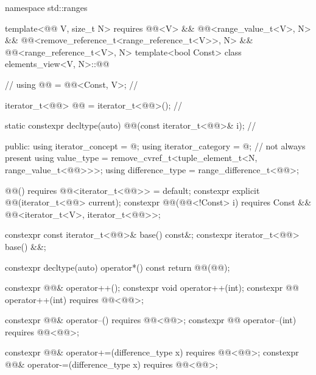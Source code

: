 %
\begin{codeblock}
namespace std::ranges {
  template<@@ V, size_t N>
    requires @@<V> && @@<range_value_t<V>, N> &&
             @@<remove_reference_t<range_reference_t<V>>, N> &&
             @@<range_reference_t<V>, N>
  template<bool Const>
  class elements_view<V, N>::@@ {                 // \expos
    using @@ = @@<Const, V>;                 // \expos

    iterator_t<@@> @@ = iterator_t<@@>();     // \expos

    static constexpr decltype(auto) @@(const iterator_t<@@>& i);     // \expos

  public:
    using iterator_concept = @\seebelow@;
    using iterator_category = @\seebelow@;                // not always present
    using value_type = remove_cvref_t<tuple_element_t<N, range_value_t<@@>>>;
    using difference_type = range_difference_t<@@>;

    @@() requires @@<iterator_t<@@>> = default;
    constexpr explicit @@(iterator_t<@@> current);
    constexpr @@(@@<!Const> i)
      requires Const && @@<iterator_t<V>, iterator_t<@@>>;

    constexpr const iterator_t<@@>& base() const&;
    constexpr iterator_t<@@> base() &&;

    constexpr decltype(auto) operator*() const
    { return @@(@@); }

    constexpr @@& operator++();
    constexpr void operator++(int);
    constexpr @@ operator++(int) requires @@<@@>;

    constexpr @@& operator--() requires @@<@@>;
    constexpr @@ operator--(int) requires @@<@@>;

    constexpr @@& operator+=(difference_type x)
      requires @@<@@>;
    constexpr @@& operator-=(difference_type x)
      requires @@<@@>;

}}
\end{codeblock}
